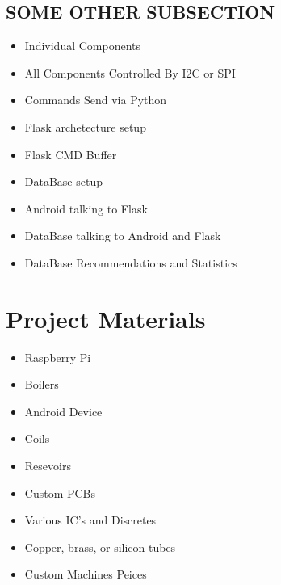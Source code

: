 \documentclass[conference]{IEEEtran}
\begin{document}
\subsection{SOME OTHER SUBSECTION}
\begin{itemize}
\item Individual Components
\item All Components Controlled By I2C or SPI
\item Commands Send via Python
\item Flask archetecture setup
\item Flask CMD Buffer
\item DataBase setup
\item Android talking to Flask
\item DataBase talking to Android and Flask
\item DataBase Recommendations and Statistics
\end{itemize}

\section{Project Materials}
\begin {itemize}
\item Raspberry Pi
\item Boilers
\item Android Device
\item Coils
\item Resevoirs
\item Custom PCBs
\item Various IC's and Discretes
\item Copper, brass, or silicon tubes
\item Custom Machines Peices
\end {itemize}

\end{document}
